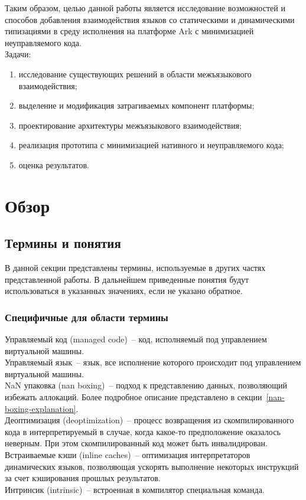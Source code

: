 \documentclass[times,specification,annotation]{itmo-student-thesis}
\begin{document}
Таким образом, целью данной работы является исследование возможностей и способов добавления взаимодействия языков со статическими и динамическими типизациями в среду исполнения на платформе Ark с минимизацией неуправляемого кода.\\
Задачи:
\begin{enumerate}
	\item исследование существующих решений в области межъязыкового взаимодействия;
	\item выделение и модификация затрагиваемых компонент платформы;
	\item проектирование архитектуры межъязыкового взаимодействия;
	\item реализация прототипа с минимизацией нативного и неуправляемого кода;
	\item оценка результатов.
\end{enumerate}

\chapter{Обзор}

\section{Термины и понятия}
В данной секции представлены термины, используемые в других частях представленной работы. В дальнейшем приведенные понятия будут использоваться в указанных значениях, если не указано обратное.
\def\MakeTerm#1#2{#1~-- #2.\\}
\subsection{Специфичные для области термины}
	\MakeTerm{Управляемый код (managed code)}{код, исполняемый под управлением виртуальной машины}
	\MakeTerm{Управляемый язык}{язык, все исполнение которого происходит под управлением виртуальной машины}
	\MakeTerm{NaN упаковка (nan boxing)}{подход к представлению данных, позволяющий избежать аллокаций. Более подробное описание представлено в секции~\ref{nan-boxing-explanation}}
	\MakeTerm{Деоптимизация (deoptimization)}{процесс возвращения из скомпилированного кода в интерпретируемый в случае, когда какое-то предположение оказалось неверным. При этом скомпилированный код может быть инвалидирован}
	\MakeTerm{Встраиваемые кэши (inline caches)}{оптимизация интерпретаторов динамических языков, позволяющая ускорять выполнение некоторых инструкций за счет кэширования прошлых результатов}
	\MakeTerm{Интринсик (intrinsic)}{встроенная в компилятор специальная команда}
\end{document}
